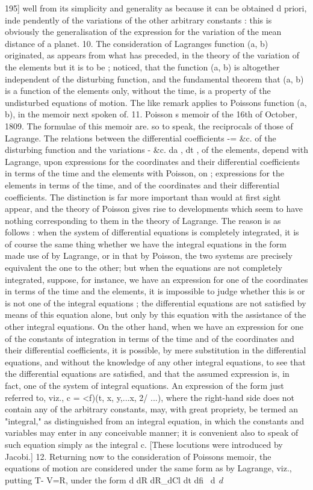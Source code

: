 \documentclass[12pt,a4paper]{article}
\theoremstyle{definition}
\begin{document}
195]
well from its simplicity and generality as because it can be obtained d priori, inde
pendently of the variations of the other arbitrary constants : this is obviously the
generalisation of the expression for the variation of the mean distance of a planet.
10. The consideration of Lagranges function (a, b) originated, as appears from
what has preceded, in the theory of the variation of the elements but it is to be
;
noticed, that the function (a, b) is altogether independent of the disturbing function,
and the fundamental theorem that (a, b) is a function of the elements only, without
the time, is a property of the undisturbed equations of motion. The like remark applies
to Poissons function (a, b), in the memoir next spoken of.
11. Poisson s memoir of the 16th of October, 1809. The formulae of this memoir
are. so to speak, the reciprocals of those of Lagrange. The relations between the
differential coefficients -= &c. of the disturbing function and the variations - &c.
da , dt ,
of the elements, depend with Lagrange, upon expressions for the coordinates and their
differential coefficients in terms of the time and the elements with Poisson, on
;
expressions for the elements in terms of the time, and of the coordinates and their
differential coefficients. The distinction is far more important than would at first sight
appear, and the theory of Poisson gives rise to developments which seem to have
nothing corresponding to them in the theory of Lagrange. The reason is as follows :
when the system of differential equations is completely integrated, it is of course the
same thing whether we have the integral equations in the form made use of by
Lagrange, or in that by Poisson, the two systems are precisely equivalent the one to
the other; but when the equations are not completely integrated, suppose, for instance,
we have an expression for one of the coordinates in terms of the time and the elements,
it is impossible to judge whether this is or is not one of the integral equations ;
the differential equations are not satisfied by means of this equation alone, but only
by this equation with the assistance of the other integral equations. On the other
hand, when we have an expression for one of the constants of integration in terms
of the time and of the coordinates and their differential coefficients, it is possible, by
mere substitution in the differential equations, and without the knowledge of any other
integral equations, to see that the differential equations are satisfied, and that the
assumed expression is, in fact, one of the system of integral equations. An expression
of the form just referred to, viz., c = <f)(t, x, y,...x, 2/ ...), where the right-hand side
does not contain any of the arbitrary constants, may, with great propriety, be termed
an "integral," as distinguished from an integral equation, in which the constants and
variables may enter in any conceivable manner; it is convenient also to speak of
such equation simply as the integral c. [These locutions were introduced by Jacobi.]
12. Returning now to the consideration of Poissons memoir, the equations of
motion are considered under the same form as by Lagrange, viz., putting T- V=R,
under the form
d dR dR_dCl
dt dfi ~d$~~d$
\end{document}
